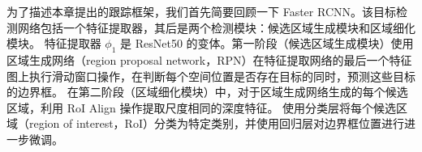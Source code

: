 

为了描述本章提出的跟踪框架，我们首先简要回顾一下 Faster RCNN。该目标检测网络包括一个特征提取器，其后是两个检测模块：候选区域生成模块和区域细化模块。
特征提取器 $\phi_{1}$ 是 ResNet50 的变体。第一阶段（候选区域生成模块）使用区域生成网络（region proposal network，RPN）在特征提取网络的最后一个特征图上执行滑动窗口操作，在判断每个空间位置是否存在目标的同时，预测这些目标的边界框。
在第二阶段（区域细化模块）中，对于区域生成网络生成的每个候选区域，利用 RoI Align \cite{He2018MaskR} 操作提取尺度相同的深度特征。
使用分类层将每个候选区域（region of interest，RoI）分类为特定类别，并使用回归层对边界框位置进行进一步微调。

